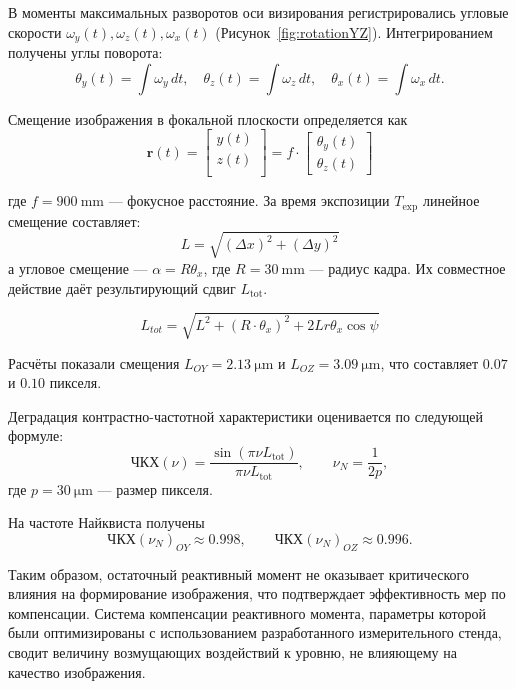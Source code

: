 В моменты максимальных разворотов оси визирования регистрировались угловые скорости
$\omega_y(t), \omega_z(t), \omega_x(t)$ (Рисунок~\cref{fig:rotationYZ}).
Интегрированием получены углы поворота:
\begin{equation}
	\theta_y(t)=\int \omega_y\,dt,\quad
	\theta_z(t)=\int \omega_z\,dt,\quad
	\theta_x(t)=\int \omega_x\,dt.
\end{equation}

Смещение изображения в фокальной плоскости определяется как
\begin{equation}
	\label{eq:bias}
	\mathbf{r}(t) = 
	\begin{bmatrix}
		y(t) \\
		z(t) \\
	\end{bmatrix}
	= f \cdot
	\begin{bmatrix}
		\theta_{y}(t) \\
		\theta_{z}(t)
	\end{bmatrix}
\end{equation}

где $f=\SI{900}{\milli\meter}$ — фокусное расстояние.
За время экспозиции $T_{\mathrm{exp}}$ линейное смещение составляет:
 \begin{equation}
	\label{eq:biasL}
	L=\sqrt{(\Delta x)^2+(\Delta y)^2}
\end{equation}
а угловое смещение — $\alpha=R\theta_x$, где $R=\SI{30}{\milli\meter}$ — радиус кадра.
Их совместное действие даёт результирующий сдвиг $L_{\mathrm{tot}}$.

 \begin{equation}
	\label{eq:L_total}
	L_{tot} = \sqrt{L^2 + (R\cdot \theta_x)^2 + 2Lr\theta_x\cos{\psi}}
\end{equation}

Расчёты показали смещения
$L_{OY}=\SI{2.13}{\micro\meter}$ и
$L_{OZ}=\SI{3.09}{\micro\meter}$,
что составляет $0.07$ и $0.10$ пикселя.

Деградация контрастно-частотной характеристики оценивается по следующей формуле:
\begin{equation}
	\text{ЧКХ}(\nu)=\frac{\sin(\pi\nu L_{\mathrm{tot}})}{\pi\nu L_{\mathrm{tot}}},\qquad
	\nu_N=\frac{1}{2p},
\end{equation}
где $p=\SI{30}{\micro\meter}$ — размер пикселя.

 На частоте Найквиста получены
\[
ЧКХ(\nu_N)_{OY}\approx 0.998,\qquad
ЧКХ(\nu_N)_{OZ}\approx 0.996.
\]

Таким образом, остаточный реактивный момент не оказывает критического
влияния на формирование изображения, что подтверждает эффективность
мер по компенсации. Система компенсации реактивного момента,
параметры которой были оптимизированы с использованием разработанного
измерительного стенда, сводит величину возмущающих воздействий к
уровню, не влияющему на качество изображения.


